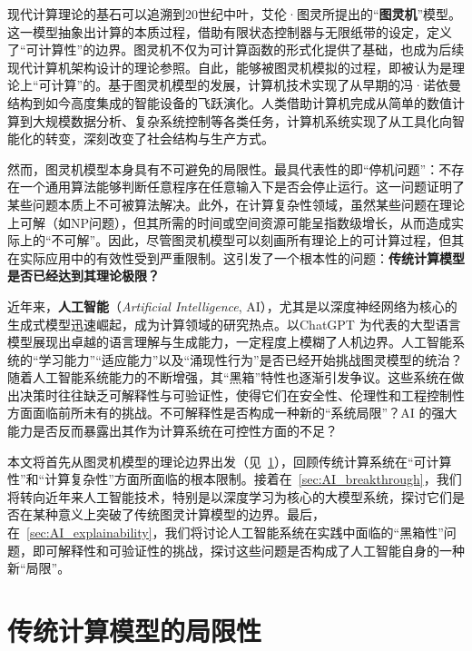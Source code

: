 \documentclass[UTF8,openany,zihao=5]{ctexbook}
\begin{document}
现代计算理论的基石可以追溯到20世纪中叶，艾伦·图灵所提出的“\textbf{图灵机}”模型\cite{turing1936computable}。这一模型抽象出计算的本质过程，借助有限状态控制器与无限纸带的设定，定义了“可计算性”的边界。图灵机不仅为可计算函数的形式化提供了基础，也成为后续现代计算机架构设计的理论参照。自此，能够被图灵机模拟的过程，即被认为是理论上“可计算”的。基于图灵机模型的发展，计算机技术实现了从早期的冯·诺依曼结构到如今高度集成的智能设备的飞跃演化。人类借助计算机完成从简单的数值计算到大规模数据分析、复杂系统控制等各类任务，计算机系统实现了从工具化向智能化的转变，深刻改变了社会结构与生产方式。

然而，图灵机模型本身具有不可避免的局限性。最具代表性的即“停机问题”：不存在一个通用算法能够判断任意程序在任意输入下是否会停止运行。这一问题证明了某些问题本质上不可被算法解决。此外，在计算复杂性领域，虽然某些问题在理论上可解（如NP问题），但其所需的时间或空间资源可能呈指数级增长，从而造成实际上的“不可解”。因此，尽管图灵机模型可以刻画所有理论上的可计算过程，但其在实际应用中的有效性受到严重限制。这引发了一个根本性的问题：\textbf{传统计算模型是否已经达到其理论极限？}

近年来，\textbf{人工智能}（\textit{Artificial Intelligence}, AI），尤其是以深度神经网络为核心的生成式模型迅速崛起，成为计算领域的研究热点。以ChatGPT\cite{radford2018improving} 为代表的大型语言模型展现出卓越的语言理解与生成能力，一定程度上模糊了人机边界。人工智能系统的“学习能力”“适应能力”以及“涌现性行为”是否已经开始挑战图灵模型的统治？随着人工智能系统能力的不断增强，其“黑箱”特性也逐渐引发争议。这些系统在做出决策时往往缺乏可解释性与可验证性，使得它们在安全性、伦理性和工程控制性方面面临前所未有的挑战。不可解释性是否构成一种新的“系统局限”？AI 的强大能力是否反而暴露出其作为计算系统在可控性方面的不足？

本文将首先从图灵机模型的理论边界出发（见\textsection~\ref{sec:traditional_computing_limitations}），回顾传统计算系统在“可计算性”和“计算复杂性”方面所面临的根本限制。接着在\textsection~\ref{sec:AI_breakthrough}，我们将转向近年来人工智能技术，特别是以深度学习为核心的大模型系统，探讨它们是否在某种意义上突破了传统图灵计算模型的边界。最后，在\textsection~\ref{sec:AI_explainability}，我们将讨论人工智能系统在实践中面临的“黑箱性”问题，即可解释性和可验证性的挑战，探讨这些问题是否构成了人工智能自身的一种新“局限”。

\chapter{传统计算模型的局限性}
\label{sec:traditional_computing_limitations}
\end{document}
